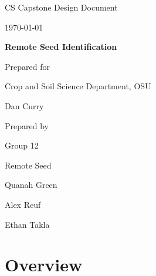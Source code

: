\documentclass[onecolumn, draftclsnofoot,10pt, compsoc]{IEEEtran}
\def \CapstoneTeamName{		Remote Seed}
\def \CapstoneTeamNumber{		12}
\def \GroupMemberOne{			Quanah Green}
\def \GroupMemberTwo{			Alex Reuf}
\def \GroupMemberThree{			Ethan Takla}
\def \CapstoneProjectName{		Remote Seed Identification}
\def \CapstoneSponsorCompany{	Crop and Soil Science Department, OSU}
\def \CapstoneSponsorPerson{		Dan Curry}
\def \DocType{		%
				Design Document
				}
\newcommand{\NameSigPair}[1]{\par
\makebox[2.75in][r]{#1} \hfil 	\makebox[3.25in]{\makebox[2.25in]{\hrulefill} \hfill		\makebox[.75in]{\hrulefill}}
\par\vspace{-12pt} \textit{\tiny\noindent
\makebox[2.75in]{} \hfil		\makebox[3.25in]{\makebox[2.25in][r]{Signature} \hfill	\makebox[.75in][r]{Date}}}}
\renewcommand{\NameSigPair}[1]{#1}
\begin{document}
\begin{titlepage}
    \begin{singlespace}
        \hfill 
        
        \par\vspace{.2in}
        \centering
        \scshape{
            \huge CS Capstone \DocType \par
            {\large\today}\par
            \vspace{.5in}
            \textbf{\Huge\CapstoneProjectName}\par
            \vfill
            {\large Prepared for}\par
            \Huge \CapstoneSponsorCompany\par
            \vspace{5pt}
            {\Large\NameSigPair{\CapstoneSponsorPerson}\par}
            {\large Prepared by }\par
            Group\CapstoneTeamNumber\par
            \CapstoneTeamName\par 
            \vspace{5pt}
            {\Large
                \NameSigPair{\GroupMemberOne}\par
                \NameSigPair{\GroupMemberTwo}\par
                \NameSigPair{\GroupMemberThree}\par
            }
            \vspace{20pt}
        }
        \begin{abstract}
        \end{abstract}     
    \end{singlespace}
\end{titlepage}
\newpage
{}
\tableofcontents
\clearpage

\section{Overview}
\end{document}
